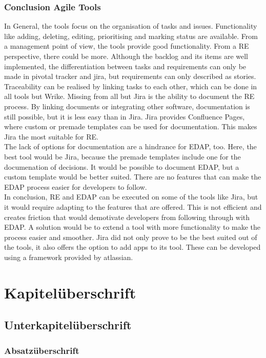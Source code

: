 \subsection*{Conclusion Agile Tools}
In General, the tools focus on the organisation of tasks and issues. Functionality like adding, deleting, editing, prioritising and marking status are available. From a management point of view, the tools provide good functionality. From a RE perspective, there could be more. Although the backlog and its items are well implemented, the differentiation between tasks and requirements can only be made in pivotal tracker and jira, but requirements can only described as stories. Traceability can be realised by linking tasks to each other, which can be done in all tools but Wrike. Missing from all but Jira is the ability to document the RE process. By linking documents or integrating other software, documentation is still possible, but it is less easy than in Jira. Jira provides Confluence Pages, where custom or premade templates can be used for documentation. This makes Jira the most suitable for RE. \\
The lack of options for documentation are a hindrance for EDAP, too. Here, the best tool would be Jira, because the premade templates include one for the documenation of decisions. It would be possible to document EDAP, but a custom template would be better suited. There are no features that can make the EDAP process easier for developers to follow. \\
In conclusion, RE and EDAP can be executed on some of the tools like Jira, but it would require adapting to the features that are offered. This is not efficient and creates friction that would demotivate developers from following through with EDAP. A solution would be to extend a tool with more functionality to make the process easier and smoother. Jira did not only prove to be the best suited out of the tools, it also offers the option to add apps to its tool. These can be developed using a framework provided by atlassian. 


\chapter{Kapitelüberschrift}

\section{Unterkapitelüberschrift}

\subsection[]{Absatzüberschrift}

